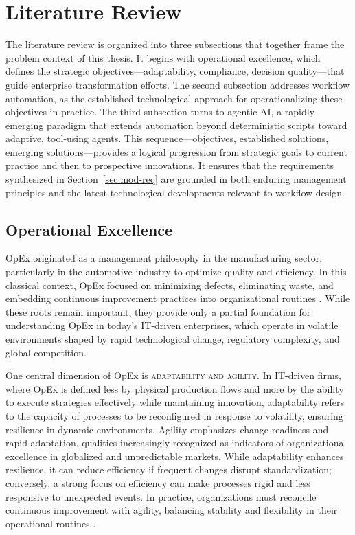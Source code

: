 \section{Literature Review}\label{sec:lit-rev}
The literature review is organized into three subsections that together frame the problem context of this thesis. It begins with operational excellence, which defines the strategic objectives—adaptability, compliance, decision quality—that guide enterprise transformation efforts. The second subsection addresses workflow automation, as the established technological approach for operationalizing these objectives in practice. The third subsection turns to agentic AI, a rapidly emerging paradigm that extends automation beyond deterministic scripts toward adaptive, tool-using agents. This sequence—objectives, established solutions, emerging solutions—provides a logical progression from strategic goals to current practice and then to prospective innovations. It ensures that the requirements synthesized in Section~\ref{sec:mod-req} are grounded in both enduring management principles and the latest technological developments relevant to workflow design.

\subsection{Operational Excellence}\label{subsec:op-ex}
OpEx originated as a management philosophy in the manufacturing sector, particularly in the automotive industry to optimize quality and efficiency. In this classical context, OpEx focused on minimizing defects, eliminating waste, and embedding continuous improvement practices into organizational routines \parencite{womackLean1997}. While these roots remain important, they provide only a partial foundation for understanding OpEx in today's IT-driven enterprises, which operate in volatile environments shaped by rapid technological change, regulatory complexity, and global competition.

One central dimension of OpEx is \textsc{adaptability and agility}. In IT-driven firms, where OpEx is defined less by physical production flows and more by the ability to execute strategies effectively while maintaining innovation, adaptability refers to the capacity of processes to be reconfigured in response to volatility, ensuring resilience in dynamic environments. Agility emphasizes change-readiness and rapid adaptation, qualities increasingly recognized as indicators of organizational excellence in globalized and unpredictable markets. While adaptability enhances resilience, it can reduce efficiency if frequent changes disrupt standardization; conversely, a strong focus on efficiency can make processes rigid and less responsive to unexpected events. In practice, organizations must reconcile continuous improvement with agility, balancing stability and flexibility in their operational routines \parencite[cf.][p. 1599]{carvalhoOperational2023}.

